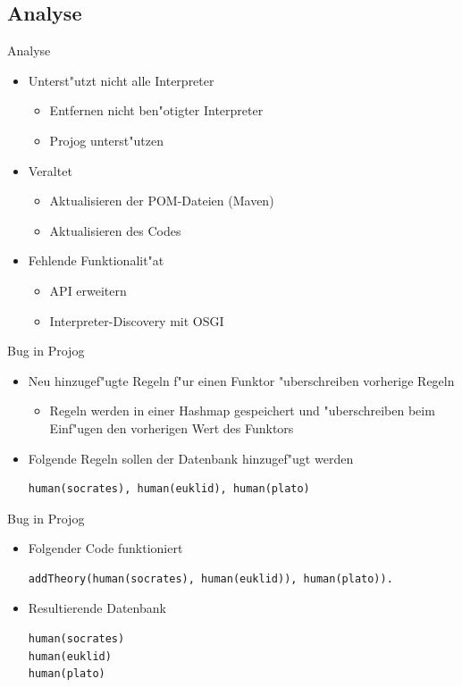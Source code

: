 \documentclass[18pt]{beamer}
\begin{document}
\subsection{Analyse}
\begin{frame}{Analyse}
\begin{itemize}
\item Unterst"utzt nicht alle Interpreter
\begin{itemize}
\item Entfernen nicht ben"otigter Interpreter
\item Projog unterst"utzen
\end{itemize}
\vspace{0.2cm}
\item Veraltet
\begin{itemize}
\item Aktualisieren der POM-Dateien (Maven)
\item Aktualisieren des Codes
\end{itemize}
\vspace{0.2cm}
\item Fehlende Funktionalit"at
\begin{itemize}
\item API erweitern
\item Interpreter-Discovery mit OSGI
\end{itemize}
\end{itemize}
\end{frame}
\begin{frame}[fragile]{Bug in Projog}
\begin{itemize}
\item Neu hinzugef"ugte Regeln f"ur einen Funktor "uberschreiben vorherige Regeln
\begin{itemize}
\item Regeln werden in einer Hashmap gespeichert und "uberschreiben beim Einf"ugen den vorherigen Wert des Funktors
\end{itemize}
\vspace{0.5cm}
\item Folgende Regeln sollen der Datenbank hinzugef"ugt werden
\begin{verbatim}
human(socrates), human(euklid), human(plato)
\end{verbatim}
\end{itemize}
\end{frame}
\begin{frame}[fragile]{Bug in Projog}
\begin{itemize}
\item Folgender Code funktioniert
\begin{verbatim}
addTheory(human(socrates), human(euklid)), human(plato)).
\end{verbatim}
\vspace{0.5cm}
\item Resultierende Datenbank
\begin{verbatim}
human(socrates)
human(euklid)
human(plato)
\end{verbatim}
\end{itemize}
\end{frame}
\end{document}

